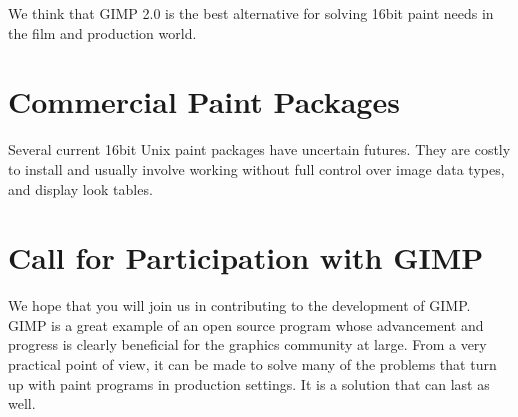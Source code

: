 We think that GIMP 2.0 is the best alternative for solving 16bit paint needs in
the film and production world. 

\section{Commercial Paint Packages}

Several current 16bit Unix paint packages have uncertain futures. They 
are costly to install and usually involve working without full control
over image data types, and display look tables. 

\section{Call for Participation with GIMP}

We hope that you will join us in contributing to the development of GIMP. GIMP
is a great example of an open source program whose advancement and progress is
clearly beneficial for the graphics community at large. From a very practical
point of view, it can be made to solve many of the problems that turn up with
paint programs in production settings. It is a solution that can last as well.
